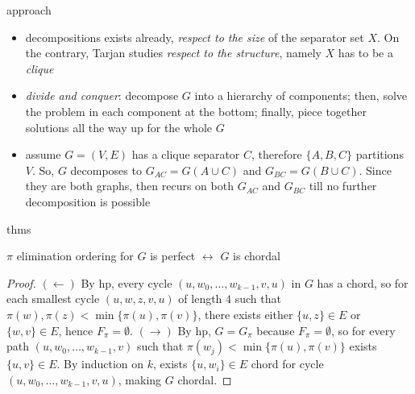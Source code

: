 \documentclass{beamer}
\begin{document}
\begin{frame}{approach}
\begin{itemize}
    \item decompositions exists already, \textit{respect to the size} of the
    separator set $X$.  On the contrary, Tarjan studies \textit{respect to the
    structure}, namely $X$ has to be a \textit{clique}
    \item \textit{divide and conquer}: decompose $G$ into a hierarchy of
    components; then, solve the problem in each component at the bottom;
    finally, piece together solutions all the way up for the whole $G$
    \item assume $G=(V, E)$ has a clique separator $C$, therefore $ \lbrace A,
    B, C \rbrace$ partitions $V$. So, $G$ decomposes to $G_{AC}=G(A\cup C)$ and
    $G_{BC}=G(B\cup C)$. Since they are both graphs, then recurs on both $G_{AC}$
    and $G_{BC}$ till no further decomposition is possible
\end{itemize}
\end{frame}

\begin{frame}{thms}
\begin{theorem}
$\pi$ elimination ordering for $G$ is perfect $\leftrightarrow$ $G$ is chordal
\end{theorem}
\begin{proof}
$(\leftarrow)$ By hp, every cycle $(u, w_{0}, \ldots, w_{k-1}, v, u)$ in $G$ has a chord, 
so for each smallest cycle $(u, w, z, v, u)$ of length $4$ such that
$\pi(w),\pi(z)<\min{\lbrace\pi(u), \pi(v)\rbrace}$, there exists either $ \lbrace u,z
\rbrace\in E$ or $ \lbrace w,v \rbrace\in E$, hence $F_{\pi}=\emptyset$.
\vfill
$(\rightarrow)$ By hp, $G=G_{\pi}$ because $F_{\pi}=\emptyset$, so for every
path $(u, w_{0}, \ldots, w_{k-1}, v)$ such that $\pi(w_{j})< \min{ \lbrace \pi(u), \pi(v) \rbrace}$
exists $ \lbrace u, v \rbrace\in E$. By induction on $k$, exists $ \lbrace u, w_{i} \rbrace\in
E$ chord for cycle $(u, w_{0}, \ldots, w_{k-1}, v, u)$, making $G$ chordal.

\end{proof}
\end{frame}
\end{document}
